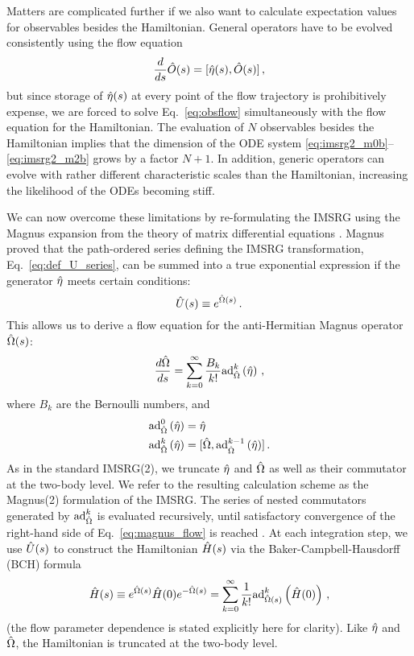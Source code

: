 {Matters are complicated further if we also want to calculate expectation
values for observables besides the Hamiltonian. General operators have
to be evolved consistently using the flow equation 
\begin{equation} \label{eq:obsflow}
  \totd{}{s} \OO(s) = \comm{\etaO(s)}{\OO(s)}\,,
\end{equation}
but since storage of $\hat{\eta}(s)$ at every point of the flow trajectory
is prohibitively expense, we are forced to solve Eq.~\eqref{eq:obsflow} 
simultaneously with the flow equation for the Hamiltonian. The evaluation
of $N$ observables besides the Hamiltonian implies that the dimension of
the ODE system \eqref{eq:imsrg2_m0b}--\eqref{eq:imsrg2_m2b} grows by a
factor $N+1$. In addition, generic operators can evolve with rather different 
characteristic scales than the Hamiltonian, increasing the likelihood of 
the ODEs becoming stiff.

We can now overcome these limitations by re-formulating the IMSRG using
the Magnus expansion from the theory of matrix differential equations
\cite{Magnus:1954xy,Blanes:2009fk}. Magnus proved that the path-ordered 
series defining the IMSRG transformation, Eq.~\eqref{eq:def_U_series},
can be summed into a true exponential expression if the generator $\hat{\eta}$
meets certain conditions:
\begin{equation} \label{eq:def_U_magnus}
  \UO(s) \equiv e^{\OmegaO(s)}\,.
\end{equation}
This allows us to derive a flow equation for the anti-Hermitian Magnus
operator $\hat{\Omega}(s)$:
\begin{equation}\label{eq:magnus_flow}
  \frac{d\OmegaO}{ds}= \sum_{k=0}^\infty \frac{B_k}{k!} \mathrm{ad}_{\OmegaO}^k\left(\etaO\right)\,,
\end{equation}
where $B_k$ are the Bernoulli numbers, and 
\begin{align}
  \mathrm{ad}_{\hat{\Omega}}^0\left(\hat{\eta}\right)&=\hat{\eta}\\
  \mathrm{ad}_{\hat{\Omega}}^k\left(\hat{\eta}\right) &= [{\hat{\Omega}},{\mathrm{ad}_{\hat{\Omega}}^{k-1}\left(\hat{\eta}\right)}]\,.
\end{align}
As in the standard IMSRG(2), we truncate $\hat{\eta}$ and $\hat{\Omega}$ as well
as their commutator at the two-body level. We refer to the resulting calculation 
scheme as the Magnus(2) formulation of the IMSRG. 
The series of nested commutators generated by $\mathrm{ad}^k_{\hat{\Omega}}$ 
is evaluated recursively, until satisfactory convergence of the right-hand 
side of Eq.~\eqref{eq:magnus_flow} is reached \cite{Morris:2015ve}. At each 
integration step, we use $\hat{U}(s)$ to construct the
Hamiltonian $\hat{H}(s)$ via the Baker-Campbell-Hausdorff (BCH) formula
\begin{equation}
  \hat{H}(s)\equiv e^{\hat{\Omega}(s)}\hat{H}(0) e^{-\hat{\Omega}(s)} = \sum_{k=0}^\infty\frac{1}{k!}\mathrm{ad}^k_{\hat{\Omega}(s)}\left(\hat{H}(0)\right)\,,
\end{equation}
(the flow parameter dependence is stated explicitly here for clarity).
Like $\hat{\eta}$ and $\hat{\Omega}$, the Hamiltonian is truncated at the two-body
level.

}
